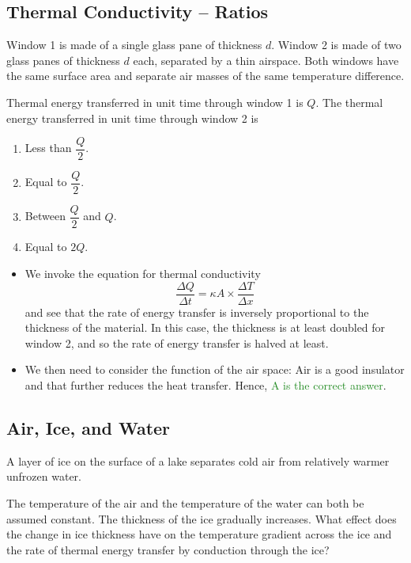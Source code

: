 \documentclass[a4paper,12pt]{article}
\begin{document}
\pagebreak

\subsection{Thermal Conductivity -- Ratios}

Window 1 is made of a single glass pane of thickness $d$. Window 2 is made of two glass panes of thickness $d$ each, separated by a thin airspace. Both windows have the same surface area and separate air masses of the same temperature difference.

Thermal energy transferred in unit time through window 1 is $Q$. The thermal energy transferred in unit time through window 2 is

\begin{enumerate}[label=\Alph*.]
  \item Less than $\dfrac{Q}{2}$.
  \item Equal to $\dfrac{Q}{2}$.
  \item Between $\dfrac{Q}{2}$ and $Q$.
  \item Equal to $2Q$.
\end{enumerate}

\begin{itemize}
  \item We invoke the equation for thermal conductivity
        $$\frac{\Delta Q}{\Delta t} = \kappa A\times \frac{\Delta T}{\Delta x}$$
        and see that the rate of energy transfer is inversely proportional to the thickness of the material. In this case, the thickness is at least doubled for window 2, and so the rate of energy transfer is halved at least.
  \item We then need to consider the function of the air space: Air is a good insulator and that further reduces the heat transfer. Hence, \textcolor{ForestGreen}{A is the correct answer}.
\end{itemize}

\pagebreak

\subsection{Air, Ice, and Water}

A layer of ice on the surface of a lake separates cold air from relatively warmer unfrozen water.

The temperature of the air and the temperature of the water can both be assumed constant. The thickness of the ice gradually increases. What effect does the change in ice thickness have on the temperature gradient across the ice and the rate of thermal energy transfer by conduction through the ice?
\end{document}
